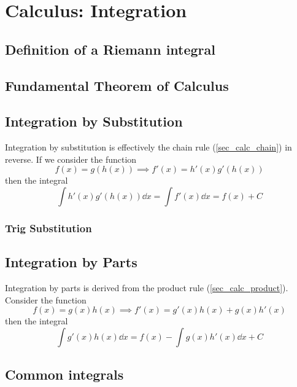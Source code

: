 \section{Calculus: Integration}

\subsection{Definition of a Riemann integral}

\subsection{Fundamental Theorem of Calculus} \label{sec_calc_FTC}

\subsection{Integration by Substitution} \label{sec_calc_substitution}

Integration by substitution is effectively the chain rule
(\ref{sec_calc_chain}) in reverse. If we consider the function
\begin{equation*}
f(x) = g(h(x)) \implies f'(x) = h'(x) g'(h(x))
\end{equation*}
then the integral
\begin{equation}
\int h'(x) g'(h(x)) \dd{x} = \int f'(x) \dd{x} = f(x) + C
\end{equation}

\subsubsection{Trig Substitution} \label{sec_calc_trig_substitution}

\subsection{Integration by Parts}

Integration by parts is derived from the product rule
(\ref{sec_calc_product}).  Consider the function
\begin{equation*}
f(x) = g(x) h(x) \implies f'(x) = g'(x) h(x) + g(x) h'(x)
\end{equation*}
then the integral
\begin{equation}
\int g'(x) h(x) \dd{x} = f(x) - \int g(x) h'(x) \dd{x} + C
\end{equation}

\subsection{Common integrals}


